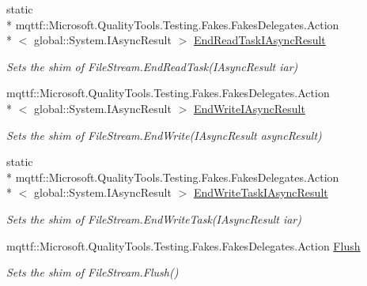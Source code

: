 \begin{DoxyCompactItemize}
static \\*
mqttf\-::\-Microsoft.\-Quality\-Tools.\-Testing.\-Fakes.\-Fakes\-Delegates.\-Action\\*
$<$ global\-::\-System.\-I\-Async\-Result $>$ \hyperlink{class_system_1_1_i_o_1_1_fakes_1_1_shim_file_stream_a999ab07cc6f64a8e58caa150dc6c2efd}{End\-Read\-Task\-I\-Async\-Result}
\begin{DoxyCompactList}\small\item\em Sets the shim of File\-Stream.\-End\-Read\-Task(\-I\-Async\-Result iar)\end{DoxyCompactList}\item 
mqttf\-::\-Microsoft.\-Quality\-Tools.\-Testing.\-Fakes.\-Fakes\-Delegates.\-Action\\*
$<$ global\-::\-System.\-I\-Async\-Result $>$ \hyperlink{class_system_1_1_i_o_1_1_fakes_1_1_shim_file_stream_ab8918ef5d13e873609c17f446adb58ac}{End\-Write\-I\-Async\-Result}
\begin{DoxyCompactList}\small\item\em Sets the shim of File\-Stream.\-End\-Write(\-I\-Async\-Result async\-Result)\end{DoxyCompactList}\item 
static \\*
mqttf\-::\-Microsoft.\-Quality\-Tools.\-Testing.\-Fakes.\-Fakes\-Delegates.\-Action\\*
$<$ global\-::\-System.\-I\-Async\-Result $>$ \hyperlink{class_system_1_1_i_o_1_1_fakes_1_1_shim_file_stream_ad559574e84ee5a7654d880d475e7009e}{End\-Write\-Task\-I\-Async\-Result}
\begin{DoxyCompactList}\small\item\em Sets the shim of File\-Stream.\-End\-Write\-Task(\-I\-Async\-Result iar)\end{DoxyCompactList}\item 
mqttf\-::\-Microsoft.\-Quality\-Tools.\-Testing.\-Fakes.\-Fakes\-Delegates.\-Action \hyperlink{class_system_1_1_i_o_1_1_fakes_1_1_shim_file_stream_af05de78e1efb7ca5ce0be6eb7d1c18db}{Flush}
\begin{DoxyCompactList}\small\item\em Sets the shim of File\-Stream.\-Flush()\end{DoxyCompactList}\item 

\end{DoxyCompactItemize}
